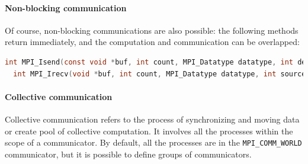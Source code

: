 \documentclass{article}
\begin{document}
\paragraph{Non-blocking communication}
Of course, non-blocking communications are also possible: the following methods return immediately, and the computation and communication can be overlapped:
\begin{lstlisting}[language=C]
  int MPI_Isend(const void *buf, int count, MPI_Datatype datatype, int dest, int tag, MPI_Comm comm, MPI_Request *request)
  int MPI_Irecv(void *buf, int count, MPI_Datatype datatype, int source, int tag, MPI_Comm comm, MPI_Request *request)
\end{lstlisting}

\paragraph{Collective communication}
Collective communication refers to the process of synchronizing and moving data or create pool of collective computation. It involves all the processes within the scope of a communicator. By default, all the processes are in the \lstinline{MPI_COMM_WORLD} communicator, but it is possible to define groups of communicators.
\end{document}
